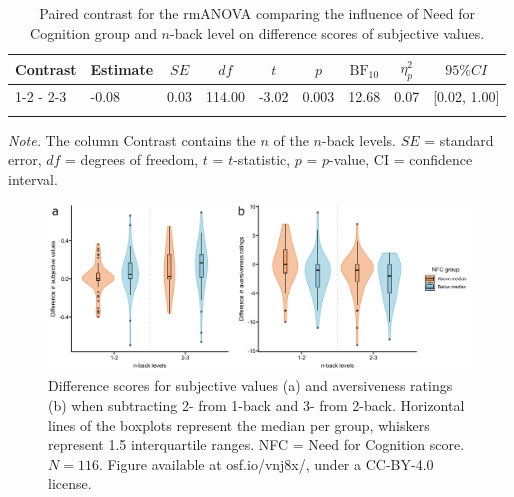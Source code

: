 \documentclass[
  man,floatsintext]{apa6}
\begin{document}
\begin{table}[H]

\begin{center}
\begin{threeparttable}

\caption{\label{tab:unnamed-chunk-11}Paired contrast for the rmANOVA comparing the influence of Need for Cognition group and $n$-back level on difference scores of subjective values.}

\begin{tabular}{lllllllll}
\toprule
Contrast & \multicolumn{1}{c}{Estimate} & \multicolumn{1}{c}{$SE$} & \multicolumn{1}{c}{$df$} & \multicolumn{1}{c}{$t$} & \multicolumn{1}{c}{$p$} & \multicolumn{1}{c}{$\mathrm{BF}_{\textrm{10}}$} & \multicolumn{1}{c}{$\eta_{p}^{2}$} & \multicolumn{1}{c}{$95\% CI$}\\
\midrule
1-2 - 2-3 & -0.08 & 0.03 & 114.00 & -3.02 & 0.003 & 12.68 & 0.07 & {}[0.02, 1.00]\\
\bottomrule
\addlinespace
\end{tabular}

\begin{tablenotes}[para]
\normalsize{\textit{Note.} The column Contrast contains the $n$ of the $n$-back levels. $SE$ = standard error, $df$ = degrees of freedom, $t$ = $t$-statistic, $p$ = $p$-value, CI = confidence interval.}
\end{tablenotes}

\end{threeparttable}
\end{center}

\end{table}

\newpage

\begin{figure}[H]
\includegraphics[width=\textwidth]{Figures/h3ac-plot} \caption{Difference scores for subjective values (a) and aversiveness ratings (b) when subtracting 2- from 1-back and 3- from 2-back. Horizontal lines of the boxplots represent the median per group, whiskers represent 1.5 interquartile ranges. NFC = Need for Cognition score. $N=116$. Figure available at osf.io/vnj8x/, under a CC-BY-4.0 license.}\label{fig:h3ac-plot}
\end{figure}
\end{document}
